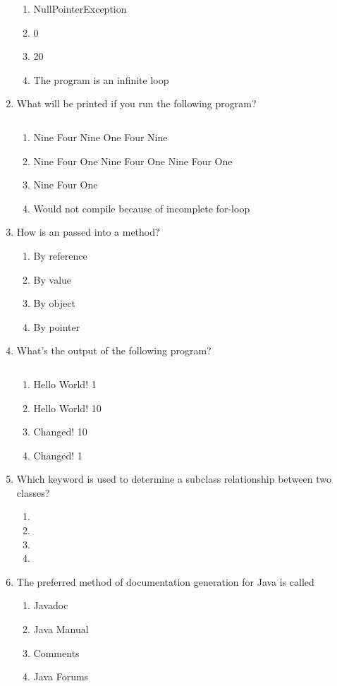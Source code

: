 \documentclass[11pt,fleqn]{article}
\begin{document}
\begin{enumerate}
	\inputminted{java}{../src/LoopTracing.java}
	\begin{enumerate}
	\item NullPointerException
	\item 0
	\item 20
	\item The program is an infinite loop
	\end{enumerate}
	\newpage
\item What will be printed if you run the following program?
	\inputminted{java}{../src/SwitchTracing.java}
	\begin{enumerate}
	\item Nine Four Nine One Four Nine 
	\item Nine Four One Nine Four One Nine Four One
	\item Nine Four One
	\item Would not compile because of incomplete for-loop
\end{enumerate}
\item How is an  passed into a method?
	\begin{enumerate}
	\item By reference
	\item By value
	\item By object
	\item By pointer
	\end{enumerate}
\item What's the output of the following program?
	\inputminted{java}{../src/MethodTracing.java}
	\begin{enumerate}
	\item Hello World! 1
	\item Hello World! 10
	\item Changed! 10
	\item Changed! 1
	\end{enumerate}
\item Which keyword is used to determine a subclass relationship between two classes?
	\begin{enumerate}
	\item {}
	\item {}
	\item {}
	\item {}
	\end{enumerate}
\item The preferred method of documentation generation for Java is called
	\begin{enumerate}
	\item Javadoc
	\item Java Manual
	\item Comments
	\item Java Forums
	\end{enumerate}
\end{enumerate}
\end{document}

